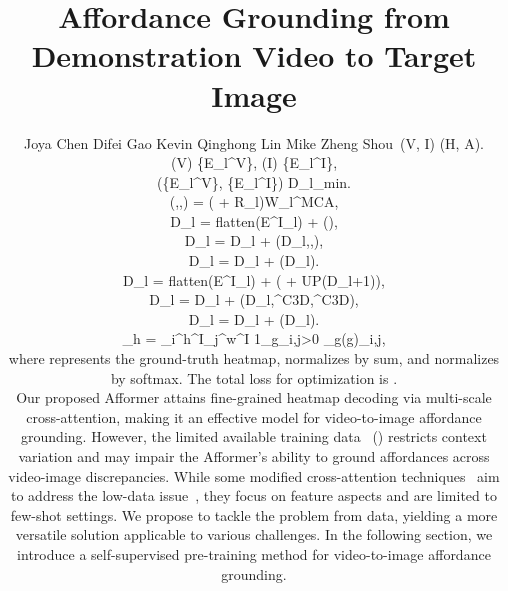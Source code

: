 \documentclass[10pt,twocolumn,letterpaper]{article}
\makeatletter
\def\thanks#1{\protected@xdef\@thanks{\@thanks
        \protect\footnotetext{#1}}}
\newcommand{\authorskip}{\hspace{5mm}}
\makeatother
\begin{document}
\title{Affordance Grounding from Demonstration Video to Target Image \vspace{-3mm}}

\author{Joya Chen \authorskip Difei Gao \authorskip Kevin Qinghong Lin \authorskip Mike Zheng Shou\thanks{Corresponding Author.}\
(V, I) \rightarrow (H, A). \label{equation1}

(V) \rightarrow \{E_l^V\}, (I) \rightarrow \{E_l^I\}, \label{equation2}

    (\{E_l^V\}, \{E_l^I\}) \rightarrow D_{l_{min}}. \label{equation3}

\begin{aligned}
(,,) = \sigma( + R_l)W_l^{MCA},
\end{aligned}

D_l = flatten(E^I_l) + (), \label{equation5} 

D_l = D_l + (D_l,,), \label{equation6}

D_l = D_l + (D_l). \label{equation7}

D_l =  flatten(E^I_l) + ( + UP(D_{l+1})), \label{equation8} 

D_l = D_l + (D_l,^{C3D},^{C3D}), \label{equation9}

D_l = D_l + (D_l). \label{equation10}

    _{h} = \sum_i^{h^I}\sum_j^{w^I} 1_{g_{i,j}>0} \sigma_{g}(g)_{i,j}\log{},  \label{equation11}


\noindent where  represents the ground-truth heatmap,  normalizes by sum, and  normalizes by softmax. The total loss for optimization is .

Our proposed Afformer attains fine-grained heatmap decoding via multi-scale cross-attention, making it an effective model for video-to-image affordance grounding. However, the limited available training data~\cite{demo2vec,hotspot,assistq} () restricts context variation and may impair the Afformer's ability to ground affordances across video-image discrepancies. While some modified cross-attention techniques~\cite{crossattn_fewshot,cat} aim to address the low-data issue~\cite{crossattn_fewshot}, they focus on feature aspects and are limited to few-shot settings. We propose to tackle the problem from data, yielding a more versatile solution applicable to various challenges. In the following section, we introduce a self-supervised pre-training method for video-to-image affordance grounding.

}
\end{document}
